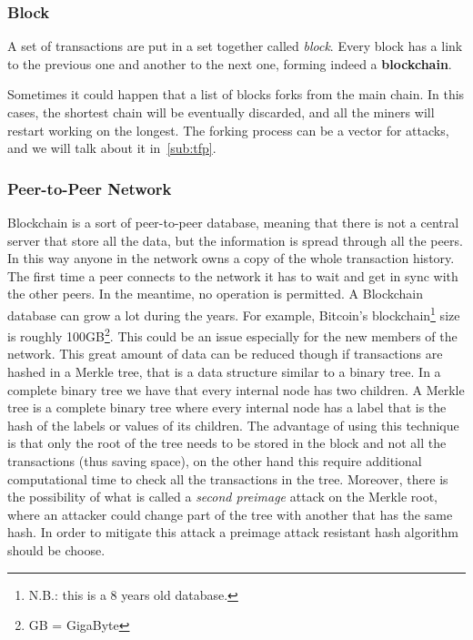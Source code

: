 \subsubsection{Block}
A set of transactions are put in a set together called \textit{block}. Every
block has a link to the previous one and another to the next one, forming
indeed a \textbf{blockchain}.

\label{sub:fork}
Sometimes it could happen that a list of blocks forks from the main chain. In
this cases, the shortest chain will be eventually discarded, and all the miners
will restart working on the longest\cite{sok15}. The forking process can be a
vector for attacks, and we will talk about it in~\ref{sub:tfp}.

\subsubsection{Peer-to-Peer Network}

Blockchain is a sort of peer-to-peer database, meaning that there is not a
central server that store all the data, but the information is spread through
all the peers.
In this way anyone in the network owns a copy of the whole transaction history.
The first time a peer connects to the network it has to wait and get in sync
with the other peers. In the meantime, no operation is permitted. A Blockchain
database can grow a lot during the years. For example, Bitcoin's
blockchain\footnote{N.B.: this is a 8 years old database.} size is roughly
100GB\footnote{GB = GigaByte}. This could be an issue especially for the new
members of the network.
This great amount of data can be reduced though if transactions are hashed in a
Merkle tree, that is a data structure similar to a binary tree. In a complete
binary tree we have that every internal node has two children. A Merkle tree is
a complete binary tree where every internal node has a label that is the hash
of the labels or values of its children\cite{szydlo04}. The advantage of using
this technique is that only the root of the tree needs to be stored in the
block and not all the transactions\cite{nakamoto08} (thus saving space), on the
other hand this require additional computational time to check all the
transactions in the tree. Moreover, there is the possibility of what is called a
\textit{second preimage} attack on the Merkle root, where an attacker could
change part of the tree with another that has the same hash\cite{rogaway04}. In
order to mitigate this attack a preimage attack resistant hash algorithm should
be choose.



